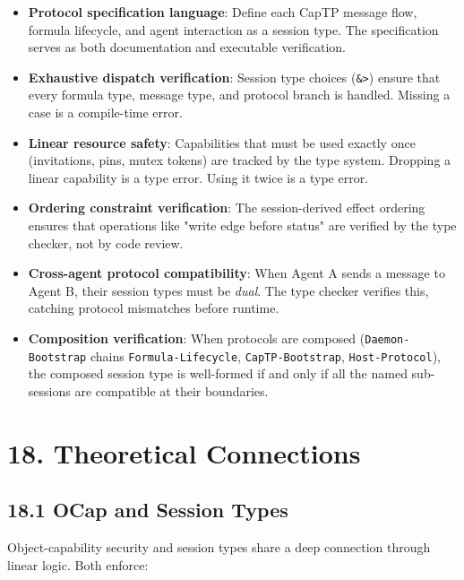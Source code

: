 \documentclass[11pt]{article}
\begin{document}
\begin{itemize}
\item \textbf{Protocol specification language}: Define each CapTP message flow, formula
lifecycle, and agent interaction as a session type. The specification
serves as both documentation and executable verification.

\item \textbf{Exhaustive dispatch verification}: Session type choices (\texttt{\&>}) ensure
that every formula type, message type, and protocol branch is handled.
Missing a case is a compile-time error.

\item \textbf{Linear resource safety}: Capabilities that must be used exactly once
(invitations, pins, mutex tokens) are tracked by the type system.
Dropping a linear capability is a type error. Using it twice is a type
error.

\item \textbf{Ordering constraint verification}: The session-derived effect ordering
ensures that operations like "write edge before status" are verified by
the type checker, not by code review.

\item \textbf{Cross-agent protocol compatibility}: When Agent A sends a message to
Agent B, their session types must be \emph{dual}. The type checker verifies
this, catching protocol mismatches before runtime.

\item \textbf{Composition verification}: When protocols are composed (\texttt{Daemon-Bootstrap}
chains \texttt{Formula-Lifecycle}, \texttt{CapTP-Bootstrap}, \texttt{Host-Protocol}), the
composed session type is well-formed if and only if all the named
sub-sessions are compatible at their boundaries.
\end{itemize}
\section{18. Theoretical Connections}
\label{sec:orge0bd02c}

\subsection{18.1 OCap and Session Types}
\label{sec:org25af20f}

Object-capability security and session types share a deep connection through
linear logic. Both enforce:
\end{document}
